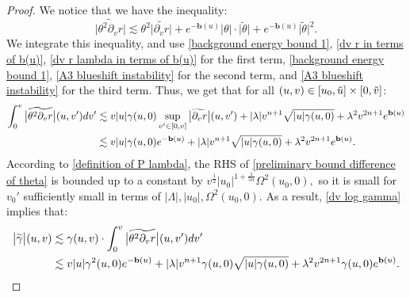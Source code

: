 \documentclass[10pt,a4paper]{amsart}
\begin{document}
\begin{proof}
    We notice that we have the inequality:
    \[\big|\widetilde{\theta^2\partial_vr}\big|\lesssim\theta^2\big|\widetilde{\partial_vr}\big|+e^{-\mathbf{b}(u)}|\theta|\cdot\big|\widetilde{\theta}\big|+e^{-\mathbf{b}(u)}\big|\widetilde{\theta}\big|^2.\]
    We integrate this inequality, and use \eqref{background energy bound 1}, \eqref{dv r in terms of b(u)}, \eqref{dv r lambda in terms of b(u)} for the first term, \eqref{background energy bound 1}, \eqref{A3 blueshift instability} for the second term, and \eqref{A3 blueshift instability} for the third term. Thus, we get that for all $(u,v)\in[u_0,\Tilde{u}]\times[0,\Tilde{v}]$:
    \begin{align}\label{preliminary bound difference of theta}
        \int_0^v\big|\widetilde{\theta^2\partial_vr}\big|(u,v')dv'&\lesssim v|u|\gamma(u,0)\sup_{v'\in[0,v]}\big|\widetilde{\partial_vr}\big|(u,v')+|\lambda| v^{n+1}\sqrt{|u|\gamma(u,0)}+\lambda^2v^{2n+1}e^{\mathbf{b}(u)}\\
        &\lesssim v|u|\gamma(u,0)e^{-\mathbf{b}(u)}+|\lambda|v^{n+1}\sqrt{|u|\gamma(u,0)}+\lambda^2v^{2n+1}e^{\mathbf{b}(u)}.\notag
    \end{align}
    According to \eqref{definition of P lambda}, the RHS of \eqref{preliminary bound difference of theta} is bounded up to a constant by $v^{\frac{1}{2}}|u_0|^{1+\frac{1}{5n}}\Omega^2(u_0,0),$ so it is small for $v_0'$ sufficiently small in terms of $|\Lambda|,|u_0|,\Omega^2(u_0,0).$ As a result, \eqref{dv log gamma} implies that:
    \begin{align}\label{preliminary bound difference of gamma}
        \big|\widetilde{\gamma}\big|(u,v)&\lesssim \gamma(u,v)\cdot\int_0^v\big|\widetilde{\theta^2\partial_vr}\big|(u,v')dv'\\
        &\lesssim v|u|\gamma^2(u,0)e^{-\mathbf{b}(u)}+|\lambda|v^{n+1}\gamma(u,0)\sqrt{|u|\gamma(u,0)}+\lambda^2v^{2n+1}\gamma(u,0)e^{\mathbf{b}(u)}.\notag
    \end{align}
    

\end{proof}
\end{document}
